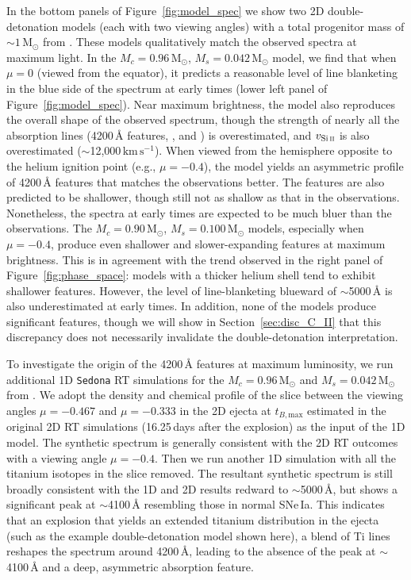 \documentclass[twocolumn]{aastex631}
\newcommand{\kms}{$\mathrm{km}\,\mathrm{s}^{-1}$}
\begin{document}
\begin{CJK*}{UTF8}{gbsn}
In the bottom panels of Figure~\ref{fig:model_spec} we show two 2D double-detonation models (each with two viewing angles) with a total progenitor mass of $\sim$$1\,\mathrm{M_\odot}$ from \citet{Shen_2D_2021}. These models qualitatively match the observed spectra at maximum light. In the $M_c=0.96\,\mathrm{M_\odot}$, $M_s=0.042\,\mathrm{M_\odot}$ model, we find that when $\mu=0$ (viewed from the equator), it predicts a reasonable level of line blanketing in the blue side of the spectrum at early times (lower left panel of Figure~\ref{fig:model_spec}). Near maximum brightness, the model also reproduces the overall shape of the observed spectrum, though the strength of nearly all the absorption lines (4200\,\r{A} features, , and ) is overestimated, and $v_\mathrm{Si\,\textsc{ii}}$ is also overestimated ($\sim$12,000\,\kms). When viewed from the hemisphere opposite to the helium ignition point (e.g., $\mu=-0.4$), the model yields an asymmetric profile of 4200\,\r{A} features that matches the observations better. The  features are also predicted to be shallower, though still not as shallow as that in the observations. Nonetheless, the spectra at early times are expected to be much bluer than the observations. The $M_c=0.90\,\mathrm{M_\odot}$, $M_s=0.100\,\mathrm{M_\odot}$ models, especially when $\mu=-0.4$, produce even shallower and slower-expanding  features at maximum brightness. This is in agreement with the trend observed in the right panel of Figure~\ref{fig:phase_space}: models with a thicker helium shell tend to exhibit shallower  features. However, the level of line-blanketing blueward of $\sim$5000\,\r{A} is also underestimated at early times. In addition, none of the models produce significant  features, though we will show in Section~\ref{sec:disc_C_II} that this discrepancy does not necessarily invalidate the double-detonation interpretation.

To investigate the origin of the 4200\,\r{A} features at maximum luminosity, we run additional 1D \texttt{Sedona} RT simulations for the $M_c=0.96\,\mathrm{M_\odot}$ and $M_s=0.042\,\mathrm{M_\odot}$ from \citet[adopted in the calculations of \citealp{Shen_2D_2021}]{Boos_2021}. We adopt the density and chemical profile of the slice between the viewing angles $\mu=-0.467$ and $\mu=-0.333$ in the 2D ejecta at $t_{B,\mathrm{max}}$ estimated in the original 2D RT simulations (16.25\,days after the explosion) as the input of the 1D model. The synthetic spectrum is generally consistent with the 2D RT outcomes with a viewing angle $\mu=-0.4$. Then we run another 1D simulation with all the titanium isotopes in the slice removed. The resultant synthetic spectrum is still broadly consistent with the 1D and 2D results redward to $\sim$5000\,\r{A}, but shows a significant peak at $\sim$4100\,\r{A} resembling those in normal SNe\,Ia. This indicates that an explosion that yields an extended titanium distribution in the ejecta (such as the example double-detonation model shown here), a blend of Ti lines reshapes the spectrum around 4200\,\r{A}, leading to the absence of the peak at $\sim$4100\,\r{A} and a deep, asymmetric absorption feature.


\end{CJK*}
\end{document}
